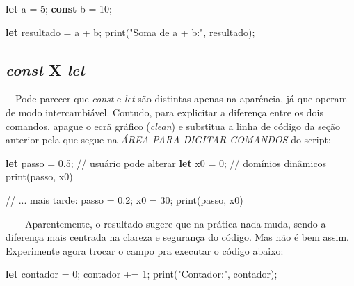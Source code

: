 \documentclass[
  portuguese,
  letterpaper,
  DIV=11,
  numbers=noendperiod]{scrreprt}
\newenvironment{Shaded}{\begin{snugshade}}{\end{snugshade}}
\newcommand{\CommentTok}[1]{\textcolor[rgb]{0.37,0.37,0.37}{#1}}
\newcommand{\DecValTok}[1]{\textcolor[rgb]{0.68,0.00,0.00}{#1}}
\newcommand{\FloatTok}[1]{\textcolor[rgb]{0.68,0.00,0.00}{#1}}
\newcommand{\FunctionTok}[1]{\textcolor[rgb]{0.28,0.35,0.67}{#1}}
\newcommand{\KeywordTok}[1]{\textcolor[rgb]{0.00,0.23,0.31}{\textbf{#1}}}
\newcommand{\NormalTok}[1]{\textcolor[rgb]{0.00,0.23,0.31}{#1}}
\newcommand{\OperatorTok}[1]{\textcolor[rgb]{0.37,0.37,0.37}{#1}}
\newcommand{\StringTok}[1]{\textcolor[rgb]{0.13,0.47,0.30}{#1}}
\begin{document}
\begin{Shaded}
\begin{Highlighting}[]
\KeywordTok{let}\NormalTok{ a }\OperatorTok{=} \DecValTok{5}\OperatorTok{;}
\KeywordTok{const}\NormalTok{ b }\OperatorTok{=} \DecValTok{10}\OperatorTok{;}

\KeywordTok{let}\NormalTok{ resultado }\OperatorTok{=}\NormalTok{ a }\OperatorTok{+}\NormalTok{ b}\OperatorTok{;}
\FunctionTok{print}\NormalTok{(}\StringTok{"Soma de a + b:"}\OperatorTok{,}\NormalTok{ resultado)}\OperatorTok{;}
\end{Highlighting}
\end{Shaded}

\hfill\break

\subsection{\texorpdfstring{\emph{const} X
\emph{let}}{const X let}}\label{const-x-let}

~~Pode parecer que \emph{const} e \emph{let} são distintas apenas na
aparência, já que operam de modo intercambiável. Contudo, para
explicitar a diferença entre os dois comandos, apague o ecrã gráfico
(\emph{clean}) e substitua a linha de código da seção anterior pela que
segue na \emph{ÁREA PARA DIGITAR COMANDOS} do script:

\begin{Shaded}
\begin{Highlighting}[]
\KeywordTok{let}\NormalTok{ passo }\OperatorTok{=} \FloatTok{0.5}\OperatorTok{;}          \CommentTok{// usuário pode alterar}
\KeywordTok{let}\NormalTok{ x0 }\OperatorTok{=} \DecValTok{0}\OperatorTok{;}      \CommentTok{// domínios dinâmicos}
\FunctionTok{print}\NormalTok{(passo}\OperatorTok{,}\NormalTok{ x0) }

\CommentTok{// ... mais tarde:}
\NormalTok{passo }\OperatorTok{=} \FloatTok{0.2}\OperatorTok{;}\NormalTok{ x0 }\OperatorTok{=} \DecValTok{30}\OperatorTok{;}
\FunctionTok{print}\NormalTok{(passo}\OperatorTok{,}\NormalTok{ x0)}
\end{Highlighting}
\end{Shaded}

~~~~Aparentemente, o resultado sugere que na prática nada muda, sendo a
diferença mais centrada na clareza e segurança do código. Mas não é bem
assim. Experimente agora trocar o campo pra executar o código abaixo:

\begin{Shaded}
\begin{Highlighting}[]
\KeywordTok{let}\NormalTok{ contador }\OperatorTok{=} \DecValTok{0}\OperatorTok{;}
\NormalTok{contador }\OperatorTok{+=} \DecValTok{1}\OperatorTok{;}
\FunctionTok{print}\NormalTok{(}\StringTok{"Contador:"}\OperatorTok{,}\NormalTok{ contador)}\OperatorTok{;}
\end{Highlighting}
\end{Shaded}
\end{document}
